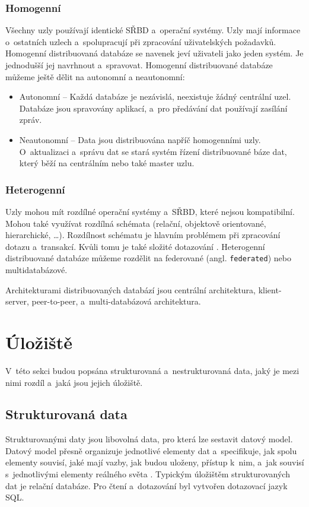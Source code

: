 \subsubsection{Homogenní}
Všechny uzly používají identické SŘBD a~operační systémy. Uzly mají informace o~ostatních uzlech a~spolupracují při zpracování uživatelských požadavků. Homogenní distribuovaná databáze se navenek jeví uživateli jako jeden systém. Je jednodušší jej navrhnout a~spravovat. Homogenní distribuované databáze můžeme ještě dělit na autonomní a neautonomní:

\begin{itemize}
    \item Autonomní -- Každá databáze je nezávislá, neexistuje žádný centrální uzel. Databáze jsou spravovány aplikací, a~pro předávání dat používají zasílání zpráv.
    
    \item Neautonomní -- Data jsou distribuována napříč homogenními uzly. O~aktualizaci a~správu dat se stará systém řízení distribuované báze dat, který běží na centrálním nebo také master uzlu.
\end{itemize}

\subsubsection{Heterogenní}
Uzly mohou mít rozdílné operační systémy a~SŘBD, které nejsou kompatibilní. Mohou také využívat rozdílná schémata (relační, objektově orientované, hierarchické, \ldots). Rozdílnost schématu je hlavním problémem při zpracování dotazu a~transakcí. Kvůli tomu je také složité dotazování \cite{wikiDBMS}. Heterogenní distribuované databáze můžeme rozdělit na federované (angl. \texttt{federated}) nebo multidatabázové.

Architekturami distribuovaných databází jsou centrální architektura, klient-server, peer-to-peer, a~multi-databázová architektura.

\section{Úložiště} \label{storage}
V~této sekci budou popsána strukturovaná a~nestrukturovaná data, jaký je mezi nimi rozdíl a~jaká jsou jejich úložiště.

\subsection{Strukturovaná data}
Strukturovanými daty jsou libovolná data, pro která lze sestavit datový model. Datový model přesně organizuje jednotlivé elementy dat a~specifikuje, jak spolu elementy souvisí, jaké mají vazby, jak budou uloženy, přístup k~nim, a~jak souvisí s~jednotlivými elementy reálného světa \cite{structData}. Typickým úložištěm strukturovaných dat je relační databáze. Pro čtení a~dotazování byl vytvořen dotazovací jazyk SQL.

